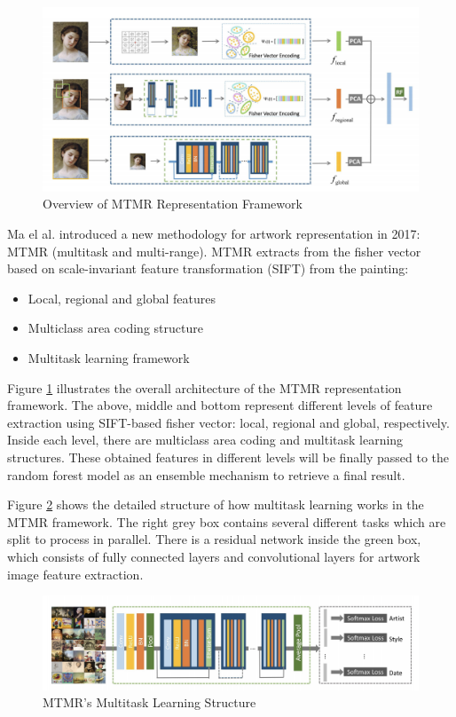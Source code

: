 \begin{figure}[h!]
\centering
\includegraphics[width=\textwidth]{MTMRoverview.pdf}
\caption{Overview of MTMR Representation Framework \cite{parttowhole}}
\label{fig:mtmroverview}
\end{figure}


Ma el al. \cite{parttowhole} introduced a new methodology for artwork representation in 2017: MTMR (multitask and multi-range). MTMR extracts from the fisher vector based on scale-invariant feature transformation (SIFT) from the painting:

\begin{itemize}
    \item Local, regional and global features
    \item Multiclass area coding structure
    \item Multitask learning framework
\end{itemize}

Figure \ref{fig:mtmroverview} illustrates the overall architecture of the MTMR representation framework. The above, middle and bottom represent different levels of feature extraction using SIFT-based fisher vector: local, regional and global, respectively. Inside each level, there are multiclass area coding and multitask learning structures. These obtained features in different levels will be finally passed to the random forest model as an ensemble mechanism to retrieve a final result.

Figure \ref{fig:mtmrmulti} shows the detailed structure of how multitask learning works in the MTMR framework. The right grey box contains several different tasks which are split to process in parallel. There is a residual network inside the green box, which consists of fully connected layers and convolutional layers for artwork image feature extraction.


\begin{figure}[h!]
\centering
\includegraphics[width=\textwidth]{MTMRmultitask.pdf}
\caption{MTMR's Multitask Learning Structure \cite{parttowhole}}
\label{fig:mtmrmulti}
\end{figure}

